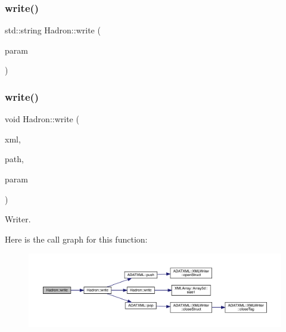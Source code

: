 \subsubsection{\texorpdfstring{write()}{write()}\hspace{0.1cm}{\footnotesize\ttfamily [15/95]}}
{\footnotesize\ttfamily std\+::string Hadron\+::write (\begin{DoxyParamCaption}\item[{const \mbox{\hyperlink{structHadron_1_1KeyCGCSU3__t}{Key\+C\+G\+C\+S\+U3\+\_\+t}} \&}]{param }\end{DoxyParamCaption})}

\mbox{\label{namespaceHadron_ab3f6a936fc8ba9b50904aca066146f48}} 
\subsubsection{\texorpdfstring{write()}{write()}\hspace{0.1cm}{\footnotesize\ttfamily [16/95]}}
{\footnotesize\ttfamily void Hadron\+::write (\begin{DoxyParamCaption}\item[{\mbox{\hyperlink{classADATXML_1_1XMLWriter}{X\+M\+L\+Writer}} \&}]{xml,  }\item[{const std\+::string \&}]{path,  }\item[{const \mbox{\hyperlink{structHadron_1_1ValTimeSlice__t}{Val\+Time\+Slice\+\_\+t}} \&}]{param }\end{DoxyParamCaption})}



Writer. 

Here is the call graph for this function\+:
\nopagebreak
\begin{figure}[H]
\begin{center}
\leavevmode
\includegraphics[width=350pt]{d1/daf/namespaceHadron_ab3f6a936fc8ba9b50904aca066146f48_cgraph}
\end{center}
\end{figure}
\mbox{\label{namespaceHadron_ae48dac33aabaaf829859c63a77a06b8b}} 
